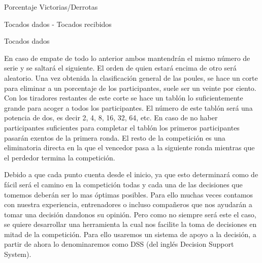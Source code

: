 \begin{compactenum}
  \item Porcentaje Victorias/Derrotas
  \item Tocados dados - Tocados recibidos
  \item Tocados dados
\end{compactenum}

En caso de empate de todo lo anterior ambos mantendrán el mismo número de serie y se saltará el siguiente. El orden de
 quien estará encima de otro será aleatorio. Una vez obtenida la clasificación general de las poules, se hace un corte
 para eliminar a un porcentaje de los participantes, suele ser un veinte por ciento. Con los tiradores restantes
 de este corte se hace un tablón lo suficientemente grande para acoger a todos los participantes. El número de este
 tablón será una potencia de dos, es decir 2, 4, 8, 16, 32, 64, etc. En caso de no haber participantes suficientes para completar
 el tablón los primeros participantes pasarán exentos de la primera ronda. El resto de la competición es una eliminatoria
 directa en la que el vencedor pasa a la siguiente ronda mientras que el perdedor termina la competición.

Debido a que cada punto cuenta desde el inicio, ya que esto determinará como de fácil será el camino en la competición
todas y cada una de las decisiones que tomemos deberán ser lo mas óptimas posibles. Para ello muchas veces contamos
con nuestra experiencia, entrenadores o incluso compañeros que nos ayudarán a tomar una decisión dandonos su opinión.
Pero como no siempre será este el caso, se quiere desarrollar una herramienta la cual nos facilite la toma de
decisiones en mitad de la competición. Para ello usaremos un sistema de apoyo a la decisión, a partir de ahora
lo denominaremos como DSS (del inglés Decision Support System).
